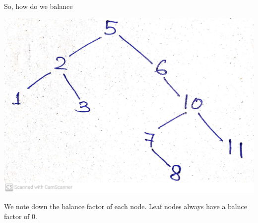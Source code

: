\documentclass[10pt, a4paper]{extarticle}
\theoremstyle{definition}
\begin{document}
		So, how do we balance
		\begin{center}
			\includegraphics[scale=0.08]{bst1.jpg}\\
		\end{center}
		We note down the balance factor of each node. Leaf nodes always have a balnce factor of 0.
\end{document}
